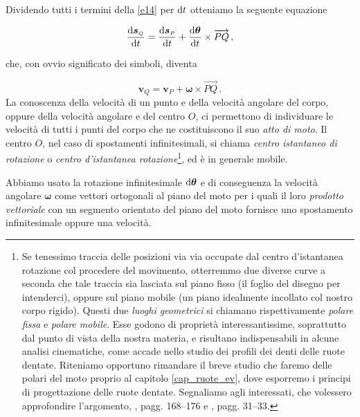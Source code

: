 \vskip 3mm
\noindent Dividendo tutti i termini della \ref{e14} per ${\rm d} t$ otteniamo la seguente 
equazione 

\begin{equation}
	{{ {\rm d} \bm{s}_{\scriptscriptstyle{Q}}}\over{{\rm d} t}} =
	{{ {\rm d} \bm{s}_{\scriptscriptstyle{P}}}\over{{\rm d} t}} +
	{{{\rm d} \bm{\theta}}\over{{\rm d}t}} \times \overrightarrow{PQ}\,,
	\label{e15}
\end{equation}	

\vskip 3mm
\noindent che, con ovvio significato dei simboli, diventa 

\begin{equation}
	{  \bm{v}_{\scriptscriptstyle{Q}}} =
	{  \bm{v}_{\scriptscriptstyle{P}}} +
	{ \bm{\bm \omega}} \times \overrightarrow{PQ}\,.
	\label{e16}
\end{equation}	
\vskip 3mm
\noindent La conoscenza della velocit\`a di un punto e della velocit\`a angolare del corpo,
oppure della velocit\`a angolare e del centro $O$, ci permettono di 
individuare le velocit\`a di tutti i punti del corpo che ne costituiscono il 
suo {\em atto di moto}.
Il centro $O$, nel caso di spostamenti infinitesimali, si chiama
{\em centro istantaneo di rotazione} o
{\em centro d'istantanea rotazione}\footnote{
Se tenessimo traccia delle posizioni via via occupate dal centro d'istantanea
rotazione col procedere del movimento, otterremmo due diverse curve a seconda 
che tale traccia sia lasciata sul piano fisso (il foglio del disegno per
intenderci), oppure sul piano mobile (un piano idealmente incollato col nostro
corpo rigido). Questi due {\em luoghi geometrici} si chiamano rispettivamente
{\em polare fissa} e {\em polare mobile}. Esse godono di propriet\`a interessantissime, soprattutto
dal punto di vista della nostra materia, e risultano indispensabili
in alcune analisi cinematiche, come accade nello studio dei profili dei denti
delle ruote dentate. Riteniamo opportuno
rimandare il breve studio che faremo delle polari del moto proprio
al capitolo \ref{cap_ruote_ev},
dove esporremo i principi di progettazione delle ruote dentate.
Segnaliamo agli interessati, che volessero approfondire l'argomento,
 \cite{finzi}, pagg. 168--176
e \cite{sesini1},  pagg. 31--33.}, ed \`e in generale mobile.

\noindent Abbiamo usato la rotazione infinitesimale
${\rm d}{\bm \theta}$ e di conseguenza la velocit\`a angolare $\bm \omega$ come 
vettori ortogonali al piano del moto per i quali il loro {\em prodotto vettoriale} 
con un segmento orientato del piano del moto fornisce uno
spostamento infinitesimale oppure una velocit\`a.


